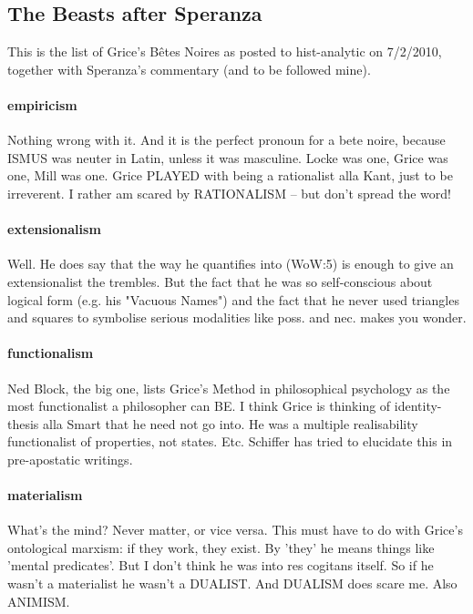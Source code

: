 \documentclass{article}
\begin{document}
\subsection{The Beasts after Speranza}\label{GriceGripes}

This is the list of Grice's B\^etes Noires as posted to hist-analytic on 7/2/2010, together with Speranza's commentary (and to be followed mine).

\paragraph{empiricism}
Nothing wrong with it. And it is the perfect pronoun for a bete 
 noire, because ISMUS was neuter in Latin, unless it was masculine. Locke 
was  one, Grice was one, Mill was one. Grice PLAYED with being a rationalist 
alla  Kant, just to be irreverent.
I rather am scared by RATIONALISM -- but 
don't  spread the word!
 
\paragraph{extensionalism}
Well. He does say that the way he quantifies into (WoW:5)  
is enough to give an extensionalist the trembles. But the fact that he was 
so  self-conscious about logical form (e.g. his "Vacuous Names") and the fact 
that  he never used triangles and squares to symbolise serious modalities 
like poss.  and nec. makes you wonder.
 
\paragraph{functionalism}
Ned Block, the big one, lists Grice's Method in  
philosophical psychology as the most functionalist a philosopher can BE. I think  Grice 
is thinking of identity-thesis alla Smart that he need not go into. He was  
a multiple realisability functionalist of properties, not states. Etc. 
Schiffer  has tried to elucidate this in pre-apostatic writings.
 
\paragraph{materialism}
What's the mind? Never matter, or vice versa. This must have  
to do with Grice's ontological marxism: if they work, they exist. By 'they' 
he  means things like 'mental predicates'. But I don't think he was into res 
 cogitans itself. So if he wasn't a materialist he wasn't a DUALIST. And 
DUALISM  does scare me. Also ANIMISM.
 
\end{document}
